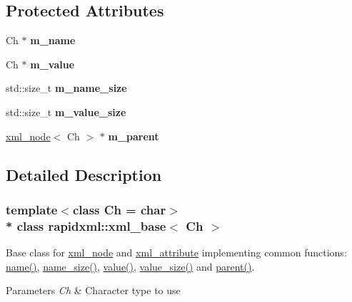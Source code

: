 \subsection*{Protected Attributes}
\begin{DoxyCompactItemize}
\item 
Ch $\ast$ {\bfseries m\+\_\+name}\hypertarget{classrapidxml_1_1xml__base_afd9851ed43e14619db0d7075ef8e9e8a}{}\label{classrapidxml_1_1xml__base_afd9851ed43e14619db0d7075ef8e9e8a}

\item 
Ch $\ast$ {\bfseries m\+\_\+value}\hypertarget{classrapidxml_1_1xml__base_a278a1ea63b0b70219b946cec47fa00ea}{}\label{classrapidxml_1_1xml__base_a278a1ea63b0b70219b946cec47fa00ea}

\item 
std\+::size\+\_\+t {\bfseries m\+\_\+name\+\_\+size}\hypertarget{classrapidxml_1_1xml__base_a5a8c76a7274b4180213796422c4df76f}{}\label{classrapidxml_1_1xml__base_a5a8c76a7274b4180213796422c4df76f}

\item 
std\+::size\+\_\+t {\bfseries m\+\_\+value\+\_\+size}\hypertarget{classrapidxml_1_1xml__base_aa3a49d8ceddb8a8d7edb773a2226b89c}{}\label{classrapidxml_1_1xml__base_aa3a49d8ceddb8a8d7edb773a2226b89c}

\item 
\hyperlink{classrapidxml_1_1xml__node}{xml\+\_\+node}$<$ Ch $>$ $\ast$ {\bfseries m\+\_\+parent}\hypertarget{classrapidxml_1_1xml__base_a90d5f660f078f66563fd7b2d8387ccb0}{}\label{classrapidxml_1_1xml__base_a90d5f660f078f66563fd7b2d8387ccb0}

\end{DoxyCompactItemize}


\subsection{Detailed Description}
\subsubsection*{template$<$class Ch = char$>$\\*
class rapidxml\+::xml\+\_\+base$<$ Ch $>$}

Base class for \hyperlink{classrapidxml_1_1xml__node}{xml\+\_\+node} and \hyperlink{classrapidxml_1_1xml__attribute}{xml\+\_\+attribute} implementing common functions\+: \hyperlink{classrapidxml_1_1xml__base_a9a09739310469995db078ebd0da3ed45}{name()}, \hyperlink{classrapidxml_1_1xml__base_a7e7f98b3d01e1eab8dc1ca69aad9af84}{name\+\_\+size()}, \hyperlink{classrapidxml_1_1xml__base_adcdaccff61c665f039d9344e447b7445}{value()}, \hyperlink{classrapidxml_1_1xml__base_a9fcf201ed0915ac18dd43b0b5dcfaf32}{value\+\_\+size()} and \hyperlink{classrapidxml_1_1xml__base_a7f31ae930f93852830234db1ae59c4c4}{parent()}. 
\begin{DoxyParams}{Parameters}
{\em Ch} & Character type to use \\
\hline
\end{DoxyParams}


